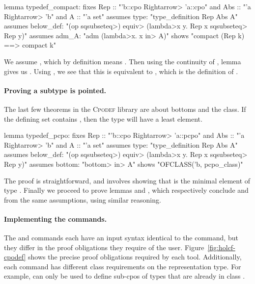 \begin{isacode}
lemma typedef_compact:
  fixes Rep :: "'b::cpo \<Rightarrow> 'a::cpo" and Abs :: "'a \<Rightarrow> 'b" and A :: "'a set"
  assumes type: "type_definition Rep Abs A"
  assumes below_def: "(op \<sqsubseteq>) \<equiv> (\<lambda>x y. Rep x \<sqsubseteq> Rep y)"
  assumes adm_A: "adm (\<lambda>x. x \<in> A)"
  shows "compact (Rep k) ==> compact k"
\end{isacode}
%
We assume , which by definition means . Then using the continuity of , lemma  gives us . Using , we see that this is equivalent to , which is the definition of .

\paragraph{Proving a subtype is pointed.} The last few theorems in the \textsc{Cpodef} library are about bottoms and the  class. If the defining set  contains , then the type  will have a least element.

\begin{isacode}
lemma typedef_pcpo:
  fixes Rep :: "'b::cpo \<Rightarrow> 'a::pcpo" and Abs :: "'a \<Rightarrow> 'b" and A :: "'a set"
  assumes type: "type_definition Rep Abs A"
  assumes below_def: "(op \<sqsubseteq>) \<equiv> (\<lambda>x y. Rep x \<sqsubseteq> Rep y)"
  assumes bottom: "\<bottom> \<in> A"
  shows "OFCLASS('b, pcpo_class)"
\end{isacode}

\noindent
The proof is straightforward, and involves showing that  is the minimal element of type . Finally we proceed to prove lemmas  and , which respectively conclude  and  from the same assumptions, using similar reasoning.

\paragraph{Implementing the commands.} The  and  commands each have an input syntax identical to the  command, but they differ in the proof obligations they require of the user. Figure~\ref{fig:holcf-cpodef} shows the precise proof obligations required by each tool. Additionally, each command has different class requirements on the representation type. For example,  can only be used to define sub-cpos of types that are already in class .

